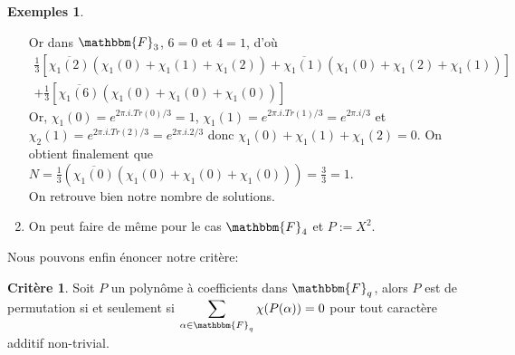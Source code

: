 \documentclass[12pt]{article}
\theoremstyle{remark}\newtheorem{note}{Note}
\theoremstyle{remark}\newtheorem{nota}{Notation}
\newcommand{\F}{\mathbbm{F}}
\newcommand{\Fq}{\mathbbm{F}_q}
\theoremstyle{definition}
\newtheorem*{examples}{Exemples}
\newtheorem{crit}{Critère}
\begin{document}
\begin{examples}
\begin{enumerate}[label = \roman*)]
Or  dans $\F_3$, $6=0$ et $4=1$, d'où
\begin{align*}
\displaystyle\frac{1}{3}\left[\overline{\chi_1(2)}(\chi_1(0) + \chi_1(1) + \chi_1(2)) + \overline{\chi_1(1)}(\chi_1(0) + \chi_1(2) + \chi_1(1))\right]\\
+\displaystyle\frac{1}{3}\left[\overline{\chi_1(6)}(\chi_1(0) + \chi_1(0) + \chi_1(0))\right]
\end{align*}
Or, $\chi_1(0) = e^{2\pi.i.Tr(0)/3} = 1$, $\chi_1(1) = e^{2\pi.i.Tr(1)/3} = e^{2\pi.i/3}$ et\\  $\chi_2(1) = e^{2\pi.i.Tr(2)/3} = e^{2\pi.i.2/3}$ donc $\chi_1(0)+\chi_1(1)+\chi_1(2) = 0$.\newline
On obtient finalement que \newline
$N = \frac{1}{3} (\overline{\chi_1(0)}(\chi_1(0)+ \chi_1(0) + \chi_1(0))) = \frac{3}{3}= 1$.\\
On retrouve bien notre nombre de solutions. 
	\item 
On peut faire de même pour le cas $\F_4$ et $P := X^2$.
	\end{enumerate}

\end{examples}

Nous pouvons enfin énoncer notre critère:

\begin{crit}
Soit $P$ un polynôme à coefficients dans $\Fq$, alors $P$ est de permutation si et seulement si $\displaystyle\sum_{\alpha \in \Fq} \chi(P(\alpha)) = 0$ pour tout caractère additif non-trivial.
\end{crit}
\end{document}
